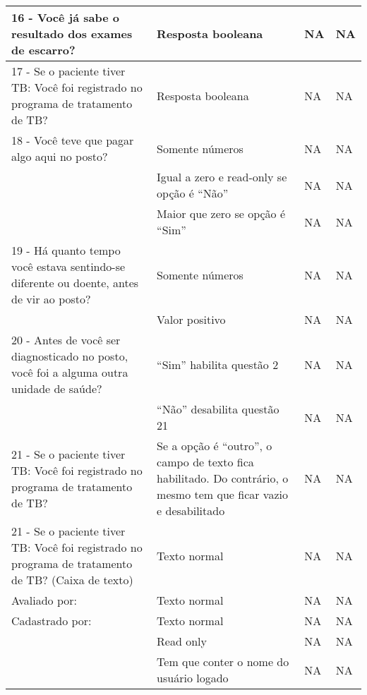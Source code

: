 \begin{longtable}{|p{}|p{}|p{}|p{}|}
16 - Você já sabe o resultado dos exames de escarro? & Resposta booleana & NA & NA \\ \hline

17 - Se o paciente tiver TB: Você foi registrado no programa de tratamento de TB? & Resposta booleana & NA & NA \\ \hline

18 - Você teve que pagar algo aqui no posto? & Somente números & NA & NA \\ \cline{2-4} & Igual a zero e read-only se opção é ``Não'' & NA & NA \\ \cline{2-4} & Maior que zero se opção é ``Sim'' & NA & NA \\ \hline

19 - Há quanto tempo você estava sentindo-se diferente ou doente, antes de vir ao posto? & Somente números & NA & NA \\ \cline{2-4} & Valor positivo & NA & NA \\ \hline

20 - Antes de você ser diagnosticado no posto, você foi a alguma outra unidade de saúde?  & ``Sim'' habilita questão 2 & NA & NA \\ \cline{2-4} & ``Não'' desabilita questão 21 & NA & NA \\ \hline

21 - Se o paciente tiver TB: Você foi registrado no programa de tratamento de TB? & Se a opção é ``outro'', o campo de texto fica habilitado. Do contrário, o mesmo tem que ficar vazio e desabilitado & NA & NA \\ \hline

21 - Se o paciente tiver TB: Você foi registrado no programa de tratamento de TB? (Caixa de texto) & Texto normal & NA & NA \\ \hline

Avaliado por: & Texto normal & NA & NA \\ \hline

Cadastrado por: & Texto normal & NA & NA \\ \cline{2-4} & Read only & NA & NA \\ \cline{2-4} & Tem que conter o nome do usuário logado & NA & NA \\ \hline


\end{longtable}
